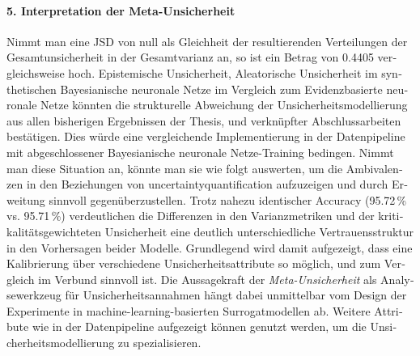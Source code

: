 \begin{otherlanguage}{ngerman}
\paragraph{5. Interpretation der Meta-Unsicherheit} Nimmt man eine JSD von null als Gleichheit der resultierenden Verteilungen der Gesamtunsicherheit in der Gesamtvarianz an, so ist ein Betrag von 0.4405 vergleichsweise hoch. \gls{Epistemische Unsicherheit}, \gls{Aleatorische Unsicherheit} im synthetischen \gls{Bayesianische neuronale Netze} im Vergleich zum \gls{Evidenzbasierte neuronale Netze} könnten die strukturelle Abweichung der Unsicherheitsmodellierung aus allen bisherigen Ergebnissen der Thesis, und verknüpfter Abschlussarbeiten bestätigen. Dies würde eine vergleichende Implementierung in der Datenpipeline mit abgeschlossener \gls{Bayesianische neuronale Netze}-Training bedingen. Nimmt man diese Situation an, könnte man sie wie folgt auswerten, um die Ambivalenzen in den Beziehungen von \gls{uncertaintyquantification} aufzuzeigen und durch Erweitung sinnvoll gegenüberzustellen. Trotz nahezu identischer Accuracy (95.72\,\% vs. 95.71\,\%) verdeutlichen die Differenzen in den Varianzmetriken und der kritikalitätsgewichteten Unsicherheit eine deutlich unterschiedliche Vertrauensstruktur in den Vorhersagen beider Modelle. Grundlegend wird damit aufgezeigt, dass eine Kalibrierung über verschiedene Unsicherheitsattribute so möglich, und zum Vergleich im Verbund sinnvoll ist. Die Aussagekraft der \textit{Meta-Unsicherheit} als Analysewerkzeug für Unsicherheitsannahmen hängt dabei unmittelbar vom Design der Experimente in machine-learning-basierten Surrogatmodellen ab. Weitere Attribute wie in der Datenpipeline aufgezeigt können genutzt werden, um die Unsicherheitsmodellierung zu spezialisieren.



\end{otherlanguage}
